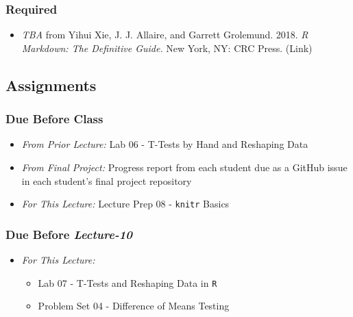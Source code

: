 \documentclass[]{book}
\providecommand{\tightlist}{%
  \setlength{\itemsep}{0pt}\setlength{\parskip}{0pt}}
\theoremstyle{definition}
\theoremstyle{definition}
\theoremstyle{definition}
\theoremstyle{remark}
\begin{document}
\hypertarget{required-9}{%
\subsubsection*{Required}\label{required-9}}

\begin{itemize}
\tightlist
\item
  \emph{TBA} from Yihui Xie, J. J. Allaire, and Garrett Grolemund. 2018.
  \emph{R Markdown: The Definitive Guide.} New York, NY: CRC Press.
  (Link)
\end{itemize}

\hypertarget{assignments-9}{%
\subsection*{Assignments}\label{assignments-9}}

\hypertarget{due-before-class-7}{%
\subsubsection*{Due Before Class}\label{due-before-class-7}}

\begin{itemize}
\tightlist
\item
  \emph{From Prior Lecture:} Lab 06 - T-Tests by Hand and Reshaping Data
\item
  \emph{From Final Project:} Progress report from each student due as a
  GitHub issue in each student's final project repository
\item
  \emph{For This Lecture:} Lecture Prep 08 - \texttt{knitr} Basics
\end{itemize}

\hypertarget{due-before-lecture-10}{%
\subsubsection*{\texorpdfstring{Due Before
\textbf{\emph{Lecture-10}}}{Due Before Lecture-10}}\label{due-before-lecture-10}}

\begin{itemize}
\tightlist
\item
  \emph{For This Lecture:}

  \begin{itemize}
  \tightlist
  \item
    Lab 07 - T-Tests and Reshaping Data in \texttt{R}
  \item
    Problem Set 04 - Difference of Means Testing
  \end{itemize}
\end{itemize}
\end{document}
